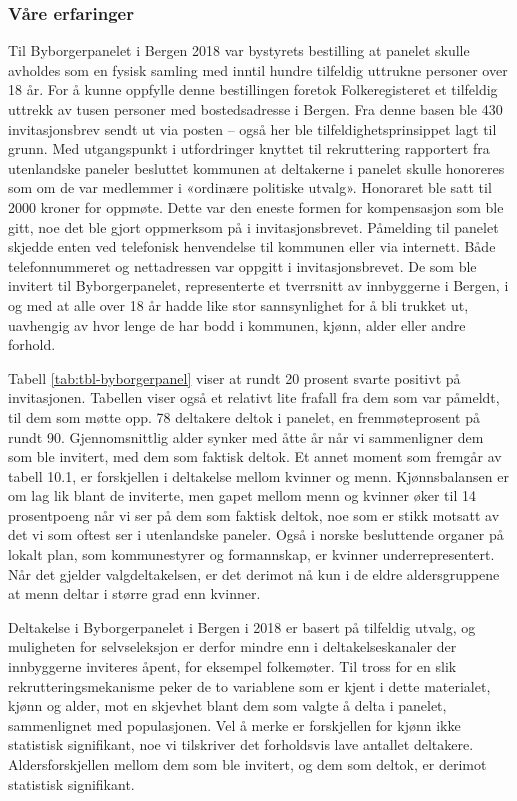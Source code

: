 \documentclass[
  12pt,
  a4paper, 12pt]{article}
\begin{document}
\hypertarget{vuxe5re-erfaringer-2}{%
\subsubsection{Våre erfaringer}\label{vuxe5re-erfaringer-2}}

Til Byborgerpanelet i Bergen 2018 var bystyrets bestilling at panelet skulle avholdes som en fysisk samling med inntil hundre tilfeldig uttrukne personer over 18 år. For å kunne oppfylle denne bestillingen foretok Folkeregisteret et tilfeldig uttrekk av tusen personer med bostedsadresse i Bergen. Fra denne basen ble 430 invitasjonsbrev sendt ut via posten -- også her ble tilfeldighetsprinsippet lagt til grunn. Med utgangspunkt i utfordringer knyttet til rekruttering rapportert fra utenlandske paneler besluttet kommunen at deltakerne i panelet skulle honoreres som om de var medlemmer i «ordinære politiske utvalg». Honoraret ble satt til 2000 kroner for oppmøte. Dette var den eneste formen for kompensasjon som ble gitt, noe det ble gjort oppmerksom på i invitasjonsbrevet. Påmelding til panelet skjedde enten ved telefonisk henvendelse til kommunen eller via internett. Både telefonnummeret og nettadressen var oppgitt i invitasjonsbrevet. De som ble invitert til Byborgerpanelet, representerte et tverrsnitt av innbyggerne i Bergen, i og med at alle over 18 år hadde like stor sannsynlighet for å bli trukket ut, uavhengig av hvor lenge de har bodd i kommunen, kjønn, alder eller andre forhold.

Tabell \ref{tab:tbl-byborgerpanel} viser at rundt 20 prosent svarte positivt på invitasjonen. Tabellen viser også et relativt lite frafall fra dem som var påmeldt, til dem som møtte opp. 78 deltakere deltok i panelet, en fremmøteprosent på rundt 90. Gjennomsnittlig alder synker med åtte år når vi sammenligner dem som ble invitert, med dem som faktisk deltok. Et annet moment som fremgår av tabell 10.1, er forskjellen i deltakelse mellom kvinner og menn. Kjønnsbalansen er om lag lik blant de inviterte, men gapet mellom menn og kvinner øker til 14 prosentpoeng når vi ser på dem som faktisk deltok, noe som er stikk motsatt av det vi som oftest ser i utenlandske paneler. Også i norske besluttende organer på lokalt plan, som kommunestyrer og formannskap, er kvinner underrepresentert. Når det gjelder valgdeltakelsen, er det derimot nå kun i de eldre aldersgruppene at menn deltar i større grad enn kvinner.

Deltakelse i Byborgerpanelet i Bergen i 2018 er basert på tilfeldig utvalg, og muligheten for selvseleksjon er derfor mindre enn i deltakelseskanaler der innbyggerne inviteres åpent, for eksempel folkemøter. Til tross for en slik rekrutteringsmekanisme peker de to variablene som er kjent i dette materialet, kjønn og alder, mot en skjevhet blant dem som valgte å delta i panelet, sammenlignet med populasjonen. Vel å merke er forskjellen for kjønn ikke statistisk signifikant, noe vi tilskriver det forholdsvis lave antallet deltakere. Aldersforskjellen mellom dem som ble invitert, og dem som deltok, er derimot statistisk signifikant.
\end{document}
